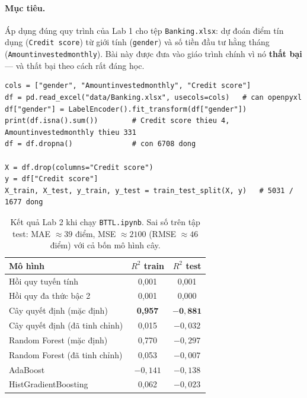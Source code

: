 \paragraph{Mục tiêu.} Áp dụng đúng quy trình của Lab 1 cho tệp \texttt{Banking.xlsx}: dự đoán điểm tín dụng (\texttt{Credit score}) từ giới tính (\texttt{gender}) và số tiền đầu tư hằng tháng (\texttt{Amountinvestedmonthly}). Bài này được đưa vào giáo trình chính vì nó \textbf{thất bại} --- và thất bại theo cách rất đáng học.

\begin{lstlisting}[caption={Lab 2 -- đọc dữ liệu từ Excel và chạy cùng quy trình}]
cols = ["gender", "Amountinvestedmonthly", "Credit score"]
df = pd.read_excel("data/Banking.xlsx", usecols=cols)   # can openpyxl
df["gender"] = LabelEncoder().fit_transform(df["gender"])
print(df.isna().sum())        # Credit score thieu 4, Amountinvestedmonthly thieu 331
df = df.dropna()              # con 6708 dong

X = df.drop(columns="Credit score")
y = df["Credit score"]
X_train, X_test, y_train, y_test = train_test_split(X, y)   # 5031 / 1677 dong
\end{lstlisting}


\begin{table}[H]
\centering
\begin{tabular}{|l|c|c|}
\hline
\textbf{Mô hình} & \textbf{$R^2$ train} & \textbf{$R^2$ test} \\
\hline
Hồi quy tuyến tính & 0,001 & 0,001 \\ \hline
Hồi quy đa thức bậc 2 & 0,001 & 0,000 \\ \hline
Cây quyết định (mặc định) & \textbf{0,957} & $\mathbf{-0{,}881}$ \\ \hline
Cây quyết định (đã tinh chỉnh) & 0,015 & $-0{,}032$ \\ \hline
Random Forest (mặc định) & 0,770 & $-0{,}297$ \\ \hline
Random Forest (đã tinh chỉnh) & 0,053 & $-0{,}007$ \\ \hline
AdaBoost & $-0{,}141$ & $-0{,}138$ \\ \hline
HistGradientBoosting & 0,062 & $-0{,}023$ \\ \hline
\end{tabular}
\caption{Kết quả Lab 2 khi chạy \texttt{BTTL.ipynb}. Sai số trên tập test: MAE $\approx 39$ điểm, MSE $\approx 2100$ (RMSE $\approx 46$ điểm) với cả bốn mô hình cây.}
\label{tab:lab-bank-r2}
\end{table}

